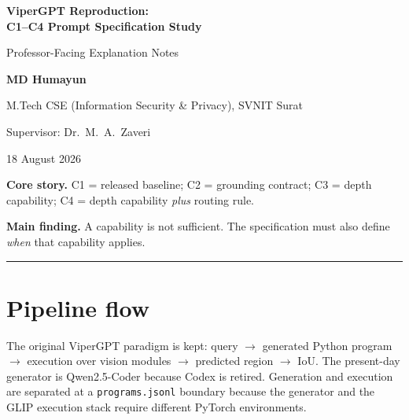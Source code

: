 \documentclass[11pt,a4paper]{article}
\begin{document}
\begin{center}
{\LARGE\bfseries\color{navy} ViperGPT Reproduction:\\[3pt]
C1--C4 Prompt Specification Study\par}
\vspace{6pt}
{\large Professor-Facing Explanation Notes\par}
\vspace{14pt}
{\large\bfseries MD Humayun\par}
{\normalsize M.Tech CSE (Information Security \& Privacy), SVNIT Surat\par}
{\normalsize Supervisor: Dr.\ M.\ A.\ Zaveri\par}
\vspace{8pt}
{\normalsize 18 August 2026\par}
\end{center}

\vspace{6pt}
\begin{callout}
\textbf{Core story.} C1 = released baseline; C2 = grounding contract; C3 = depth
capability; C4 = depth capability \emph{plus} routing rule.

\smallskip
\textbf{Main finding.} A capability is not sufficient. The specification must also
define \emph{when} that capability applies.
\end{callout}

\tableofcontents
\vspace{10pt}
\hrule

\section{Pipeline flow}

The original ViperGPT paradigm is kept: query $\rightarrow$ generated Python program
$\rightarrow$ execution over vision modules $\rightarrow$ predicted region
$\rightarrow$ IoU. The present-day generator is Qwen2.5-Coder because Codex is
retired. Generation and execution are separated at a \texttt{programs.jsonl} boundary
because the generator and the GLIP execution stack require different PyTorch
environments.

\begin{center}
\end{center}
\end{document}
